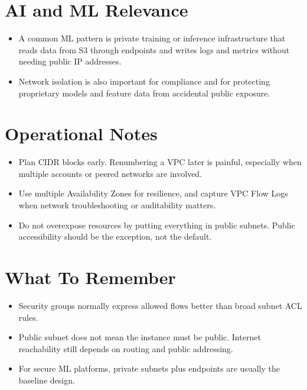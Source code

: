 \documentclass[10pt,twocolumn]{article}
\begin{document}
\section*{AI and ML Relevance}
\begin{itemize}
\item A common ML pattern is private training or inference infrastructure that reads data from S3 through endpoints and writes logs and metrics without needing public IP addresses.
\item Network isolation is also important for compliance and for protecting proprietary models and feature data from accidental public exposure.
\end{itemize}

\section*{Operational Notes}
\begin{itemize}
\item Plan CIDR blocks early. Renumbering a VPC later is painful, especially when multiple accounts or peered networks are involved.
\item Use multiple Availability Zones for resilience, and capture VPC Flow Logs when network troubleshooting or auditability matters.
\item Do not overexpose resources by putting everything in public subnets. Public accessibility should be the exception, not the default.
\end{itemize}

\section*{What To Remember}
\begin{itemize}
\item Security groups normally express allowed flows better than broad subnet ACL rules.
\item Public subnet does not mean the instance must be public. Internet reachability still depends on routing and public addressing.
\item For secure ML platforms, private subnets plus endpoints are usually the baseline design.
\end{itemize}
\end{document}
